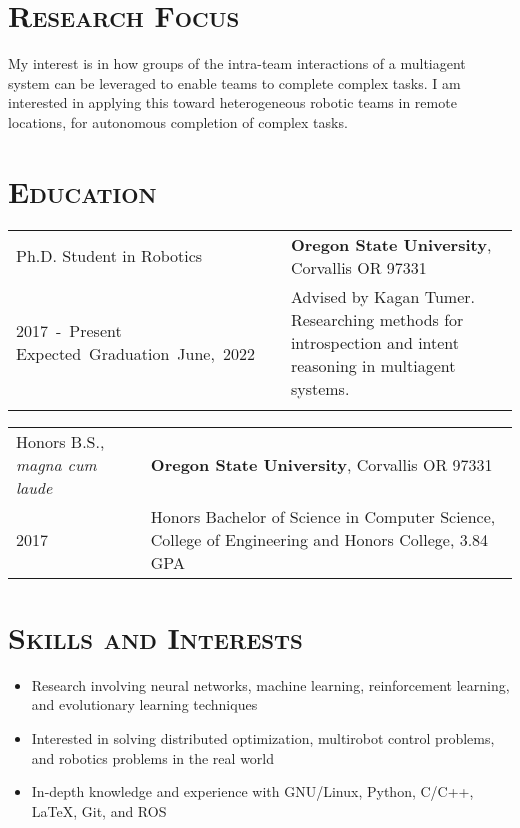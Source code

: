 \documentclass[letterpaper,10pt,titlepage]{article}
\newcommand{\leftW}{0.32\textwidth}
\begin{document}
\pagestyle{empty}%
\par{\par}

\section*{\textsc{Research Focus}}
My interest is in how groups of the intra-team interactions of a multiagent system can be leveraged to enable teams to complete complex tasks.
I am interested in applying this toward heterogeneous robotic teams in remote locations, for autonomous completion of complex tasks.
\section*{\textsc{Education}}
\begin{tabularx}{\textwidth}{p{\leftW}X}
	Ph.D. Student in Robotics & \textbf{Oregon State University}, Corvallis OR 97331\\

	\mbox{2017 - Present} \mbox{Expected Graduation June, 2022}& Advised by Kagan Tumer. Researching methods for introspection and intent reasoning in multiagent systems.\\
	 &\\
\end{tabularx}
\begin{tabularx}{\textwidth}{p{\leftW}X}
	Honors B.S., \textit{magna cum laude} & \textbf{Oregon State University}, Corvallis OR 97331\\
	2017 & Honors Bachelor of Science in Computer Science, College of Engineering and Honors College, 3.84 GPA \\
\end{tabularx}

\section*{\textsc{Skills and Interests}}
\begin{itemize} \itemsep1pt \parskip0pt 
\item Research involving neural networks, machine learning, reinforcement learning, and evolutionary learning techniques
\item Interested in solving distributed optimization, multirobot control problems, and robotics problems in the real world
\item In-depth knowledge and experience with GNU/Linux, Python, C/C++, \LaTeX, Git, and ROS
\end{itemize}
\end{document}
